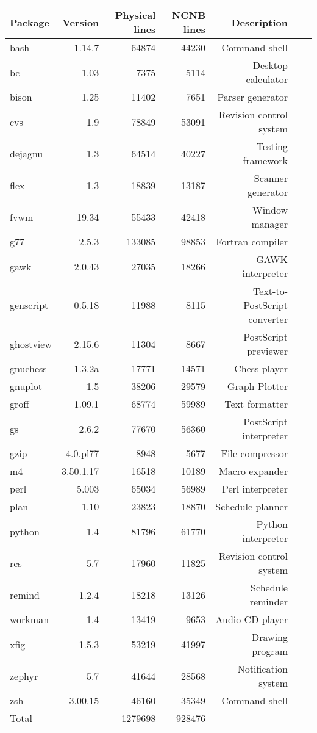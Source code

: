 \begin{tabular}{|l|r|r|r|r|r|r|}\hline
Package & Version & Physical lines & NCNB lines & Description\\\hline
bash & 1.14.7 & 64874 & 44230 & Command shell \\\hline
bc & 1.03 & 7375 & 5114 & Desktop calculator \\\hline
bison & 1.25 & 11402 & 7651 & Parser generator \\\hline
cvs & 1.9 & 78849 & 53091 & Revision control system \\\hline
dejagnu & 1.3 & 64514 & 40227 & Testing framework \\\hline
flex & 1.3 & 18839 & 13187 & Scanner generator \\\hline
fvwm & 19.34 & 55433 & 42418 & Window manager \\\hline
g77 & 2.5.3 & 133085 & 98853 & Fortran compiler \\\hline
gawk & 2.0.43 & 27035 & 18266 & GAWK interpreter \\\hline
genscript & 0.5.18 & 11988 & 8115 & Text-to-PostScript converter \\\hline
ghostview & 2.15.6 & 11304 & 8667 & PostScript previewer \\\hline
gnuchess & 1.3.2a & 17771 & 14571 & Chess player \\\hline
gnuplot & 1.5 & 38206 & 29579 & Graph Plotter \\\hline
groff & 1.09.1 & 68774 & 59989 & Text formatter \\\hline
gs & 2.6.2 & 77670 & 56360 & PostScript interpreter \\\hline
gzip & 4.0.pl77 & 8948 & 5677 & File compressor \\\hline
m4 & 3.50.1.17 & 16518 & 10189 & Macro expander \\\hline
perl & 5.003 & 65034 & 56989 & Perl interpreter \\\hline
plan & 1.10 & 23823 & 18870 & Schedule planner \\\hline
python & 1.4 & 81796 & 61770 & Python interpreter \\\hline
rcs & 5.7 & 17960 & 11825 & Revision control system \\\hline
remind & 1.2.4 & 18218 & 13126 & Schedule reminder \\\hline
workman & 1.4 & 13419 & 9653 & Audio CD player \\\hline
xfig & 1.5.3 & 53219 & 41997 & Drawing program \\\hline
zephyr & 5.7 & 41644 & 28568 & Notification system \\\hline
zsh & 3.00.15 & 46160 & 35349 & Command shell \\\hline
Total & & 1279698 & 928476 & \\\hline
\end{tabular}

